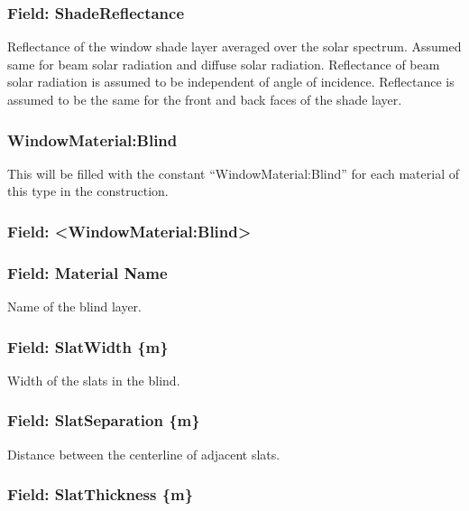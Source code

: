 \subsubsection{Field: ShadeReflectance}\label{field-shadereflectance}

Reflectance of the window shade layer averaged over the solar spectrum. Assumed same for beam solar radiation and diffuse solar radiation. Reflectance of beam solar radiation is assumed to be independent of angle of incidence. Reflectance is assumed to be the same for the front and back faces of the shade layer.

\subsubsection{WindowMaterial:Blind}\label{materialwindowblind}

This will be filled with the constant ``WindowMaterial:Blind'' for each material of this type in the construction.

\subsubsection{Field: \textless{}WindowMaterial:Blind\textgreater{}}\label{field-materialwindowblind}

\subsubsection{Field: Material Name}\label{field-material-name-5}

Name of the blind layer.

\subsubsection{Field: SlatWidth \{m\}}\label{field-slatwidth-m}

Width of the slats in the blind.

\subsubsection{Field: SlatSeparation \{m\}}\label{field-slatseparation-m}

Distance between the centerline of adjacent slats.

\subsubsection{Field: SlatThickness \{m\}}\label{field-slatthickness-m}

